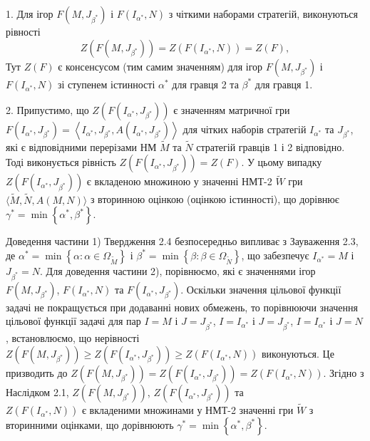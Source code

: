 \documentclass[14pt, a4paper, oneside]{extarticle}
\numberwithin{equation}{section}
\begin{document}
1. Для ігор $F\left(M, J_{\beta^{*}}\right)$ і $F\left(I_{\alpha^{*}}, N\right)$ з чіткими наборами стратегій, виконуються рівності
\begin{equation*}
Z\left(F\left(M, J_{\beta^{*}}\right)\right)=Z\left(F\left(I_{\alpha^{*}}, N\right)\right)=Z(F),
\end{equation*}
Тут $Z(F)$ є консенсусом (тим самим значенням) для ігор $F\left(M, J_{\beta^{*}}\right)$ і\\ $F\left(I_{\alpha^{*}}, N\right)$ зі ступенем істинності $\alpha^{*}$ для гравця 2 та $\beta^{*}$ для гравця 1.

2. Припустимо, що $Z\left(F\left(I_{\alpha^{*}}, J_{\beta^{*}}\right)\right)$ є значенням матричної гри\\ $F\left(I_{\alpha^{*}}, J_{\beta^{*}}\right)=\left\langle I_{\alpha^{*}}, J_{\beta^{*}}, A\left(I_{\alpha^{*}}, J_{\beta^{*}}\right)\right\rangle$ для чітких наборів стратегій $I_{\alpha^{*}}$ та $J_{\beta^{*}}$, які є відповідними перерізами НМ $\tilde{M}$ та $\tilde{N}$ стратегій гравців 1 і 2 відповідно. Тоді виконується рівність $Z\left(F\left(I_{\alpha^{*}}, J_{\beta^{*}}\right)\right)=Z(F)$. У цьому випадку $Z\left(F\left(I_{\alpha^{*}}, J_{\beta^{*}}\right)\right)$ є вкладеною множиною у значенні НМТ-2 $\tilde{W}$ гри $\langle\tilde{M}, \tilde{N}, A(M, N)\rangle$ з вторинною оцінкою (оцінкою істинності), що дорівнює $\gamma^{*}=\min \left\{\alpha^{*}, \beta^{*}\right\}$.

Доведення частини 1) Твердження 2.4 безпосередньо випливає з Зауваження 2.3, де $\alpha^{*} = \min \left\{ \alpha: \alpha \in \Omega_{\tilde{M}} \right\}$ і $\beta^{*} = \min \left\{ \beta: \beta \in \Omega_{\tilde{N}} \right\}$, що забезпечує $I_{\alpha^{*}} = M$ і $J_{\beta^{*}} = N$. Для доведення частини 2), порівнюємо, які є значеннями ігор $F\left(M, J_{\beta^{*}}\right)$, $F\left(I_{\alpha^{*}}, N\right)$ та $F\left(I_{\alpha^{*}}, J_{\beta^{*}}\right)$. Оскільки значення цільової функції задачі не покращується при додаванні нових обмежень, то порівнюючи значення цільової функції задачі для пар $I=M$ і $J=J_{\beta^{*}}$, $I=I_{\alpha^{*}}$ і $J=J_{\beta^{*}}$, $I=I_{\alpha^{*}}$ і $J=N$, встановлюємо, що нерівності $Z\left(F\left(M, J_{\beta^{*}}\right)\right) \geq Z\left(F\left(I_{\alpha^{*}}, J_{\beta^{*}}\right)\right) \geq Z\left(F\left(I_{\alpha^{*}}, N\right)\right)$ виконуються. Це призводить до $Z\left(F\left(M, J_{\beta^{*}}\right)\right) = Z\left(F\left(I_{\alpha^{*}}, J_{\beta^{*}}\right)\right) = Z\left(F\left(I_{\alpha^{*}}, N\right)\right)$. Згідно з Наслідком 2.1, $Z\left(F\left(M, J_{\beta^{*}}\right)\right)$, $Z\left(F\left(I_{\alpha^{*}}, J_{\beta^{*}}\right)\right)$ та \\$Z\left(F\left(I_{\alpha^{*}}, N\right)\right)$ є вкладеними множинами у НМТ-2 значенні гри $\tilde{W}$ з вторинними оцінками, що дорівнюють $\gamma^{*} = \min \left\{ \alpha^{*}, \beta^{*} \right\}$.
\end{document}
